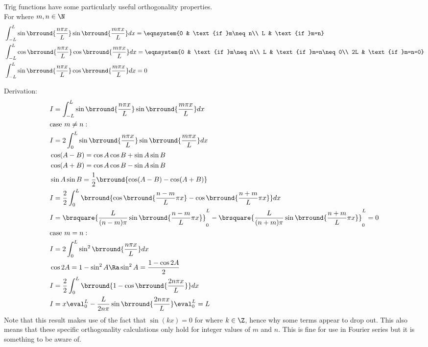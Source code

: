 Trig functions have some particularly useful orthogonality properties.\\
For where $m,n\in\N$
\begin{align*}
    &\int_{-L}^L\sin\brround{\frac{n\pi x}{L}}\sin\brround{\frac{m\pi x}{L}}dx=\eqnsystem{0 & \text{if }m\neq n\\ L & \text{if }m=n}\\
    &\int_{-L}^L\cos\brround{\frac{n\pi x}{L}}\cos\brround{\frac{m\pi x}{L}}dx=\eqnsystem{0 & \text{if }m\neq n\\ L & \text{if }m=n\neq 0\\ 2L & \text{if }m=n=0}\\
    &\int_{-L}^L\sin\brround{\frac{n\pi x}{L}}\cos\brround{\frac{m\pi x}{L}}dx=0
\end{align*}

Derivation:
\begin{align*}
    &I=\int_{-L}^L\sin\brround{\frac{n\pi x}{L}}\sin\brround{\frac{m\pi x}{L}}dx\\
    &\text{case }m\neq n:\\
    &I=2\int_{0}^L\sin\brround{\frac{n\pi x}{L}}\sin\brround{\frac{m\pi x}{L}}dx\\
    &\cos(A-B)=\cos A\cos B+\sin A\sin B\\
    &\cos(A+B)=\cos A\cos B-\sin A\sin B\\
    &\sin A\sin B=\frac{1}{2}\brround{\cos(A-B)-\cos(A+B)}\\
    &I=\frac{2}{2}\int_0^L\brround{\cos\brround{\frac{n-m}{L}\pi x}-\cos\brround{\frac{n+m}{L}\pi x}}dx\\
    &I=\brsquare{\frac{L}{(n-m)\pi}\sin\brround{\frac{n-m}{L}\pi x}}_0^L-\brsquare{\frac{L}{(n+m)\pi}\sin\brround{\frac{n+m}{L}\pi x}}_0^L=0\\
    &\text{case }m=n:\\
    &I=2\int_0^L\sin^2\brround{\frac{n\pi x}{L}}dx\\
    &\cos 2A=1-\sin^2A\Ra \sin^2 A=\frac{1-\cos 2A}{2}\\
    &I=\frac{2}{2}\int_0^L\brround{1-\cos\brround{\frac{2n\pi x}{L}}}dx\\
    &I={x}\eval_0^L-{\frac{L}{2n\pi}\sin\brround{\frac{2n\pi x}{L}}}\eval_0^L=L
\end{align*}
Note that this result makes use of the fact that $\sin(kx)=0$ for where $k\in\Z$, hence why some terms appear to drop out. This also means that these specific orthogonality calculations only hold for integer values of $m$ and $n$. This is fine for use in Fourier series but it is something to be aware of.\\

